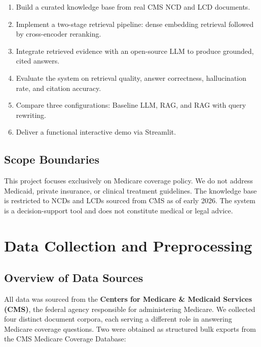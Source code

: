 \documentclass[10pt, letterpaper]{article}
\begin{document}
\begin{enumerate}[noitemsep, topsep=4pt]
    \item Build a curated knowledge base from real CMS NCD and LCD documents.
    \item Implement a two-stage retrieval pipeline: dense embedding retrieval followed
          by cross-encoder reranking.
    \item Integrate retrieved evidence with an open-source LLM to produce grounded,
          cited answers.
    \item Evaluate the system on retrieval quality, answer correctness, hallucination
          rate, and citation accuracy.
    \item Compare three configurations: Baseline LLM, RAG, and RAG with query rewriting.
    \item Deliver a functional interactive demo via Streamlit.
\end{enumerate}
 
\subsection{Scope Boundaries}
 
This project focuses exclusively on Medicare coverage policy. We do not address Medicaid,
private insurance, or clinical treatment guidelines. The knowledge base is restricted to
NCDs and LCDs sourced from CMS as of early 2026. The system is a decision-support tool
and does not constitute medical or legal advice.
 
\section{Data Collection and Preprocessing}
 
\subsection{Overview of Data Sources}
 
All data was sourced from the \textbf{Centers for Medicare \& Medicaid Services (CMS)},
the federal agency responsible for administering Medicare. We collected four distinct
document corpora, each serving a different role in answering Medicare coverage questions.
Two were obtained as structured bulk exports from the CMS Medicare Coverage Database:
 
\end{document}
